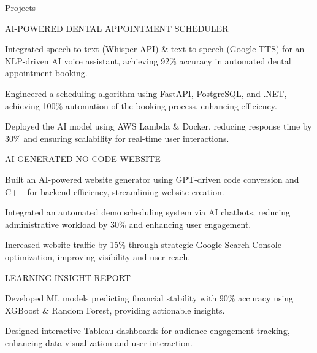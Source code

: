 \documentclass{resume} %
\begin{document}
    \begin{rSection}{Projects}
                    \begin{rSubsection}
                                    {AI{-}POWERED DENTAL APPOINTMENT SCHEDULER}
                                {}{}{}
                                    \item Integrated speech{-}to{-}text (Whisper API) \& text{-}to{-}speech (Google TTS) for an NLP{-}driven AI voice assistant, achieving 92\% accuracy in automated dental appointment booking.
                                    \item Engineered a scheduling algorithm using FastAPI, PostgreSQL, and .NET, achieving 100\% automation of the booking process, enhancing efficiency.
                                    \item Deployed the AI model using AWS Lambda \& Docker, reducing response time by 30\% and ensuring scalability for real{-}time user interactions.
                            \end{rSubsection}
                    \begin{rSubsection}
                                    {AI{-}GENERATED NO{-}CODE WEBSITE}
                                {}{}{}
                                    \item Built an AI{-}powered website generator using GPT{-}driven code conversion and C++ for backend efficiency, streamlining website creation.
                                    \item Integrated an automated demo scheduling system via AI chatbots, reducing administrative workload by 30\% and enhancing user engagement.
                                    \item Increased website traffic by 15\% through strategic Google Search Console optimization, improving visibility and user reach.
                            \end{rSubsection}
                    \begin{rSubsection}
                                    {LEARNING INSIGHT REPORT}
                                {}{}{}
                                    \item Developed ML models predicting financial stability with 90\% accuracy using XGBoost \& Random Forest, providing actionable insights.
                                    \item Designed interactive Tableau dashboards for audience engagement tracking, enhancing data visualization and user interaction.

\end{rSubsection}
\end{rSection}
\end{document}
